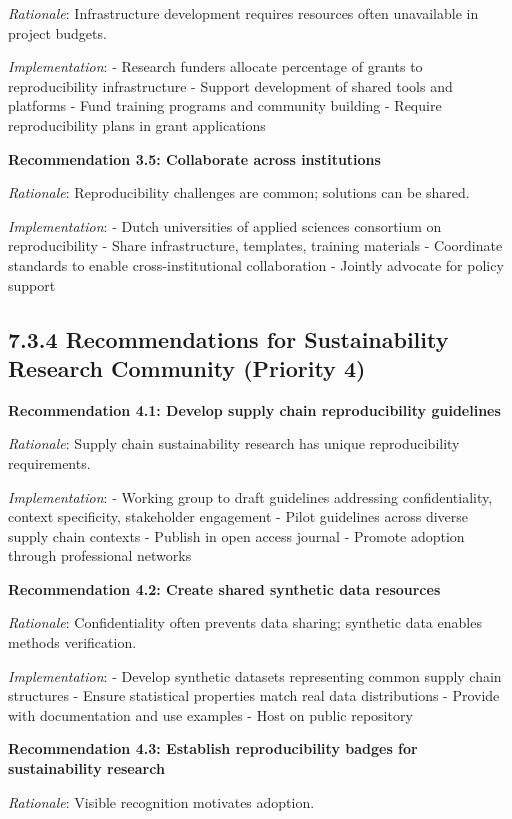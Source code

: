 \documentclass[
  oneside,
  open=any]{scrbook}
\begin{document}
\emph{Rationale}: Infrastructure development requires resources often
unavailable in project budgets.

\emph{Implementation}: - Research funders allocate percentage of grants
to reproducibility infrastructure - Support development of shared tools
and platforms - Fund training programs and community building - Require
reproducibility plans in grant applications

\textbf{Recommendation 3.5: Collaborate across institutions}

\emph{Rationale}: Reproducibility challenges are common; solutions can
be shared.

\emph{Implementation}: - Dutch universities of applied sciences
consortium on reproducibility - Share infrastructure, templates,
training materials - Coordinate standards to enable cross-institutional
collaboration - Jointly advocate for policy support

\subsection{7.3.4 Recommendations for Sustainability Research Community
(Priority
4)}\label{recommendations-for-sustainability-research-community-priority-4}

\textbf{Recommendation 4.1: Develop supply chain reproducibility
guidelines}

\emph{Rationale}: Supply chain sustainability research has unique
reproducibility requirements.

\emph{Implementation}: - Working group to draft guidelines addressing
confidentiality, context specificity, stakeholder engagement - Pilot
guidelines across diverse supply chain contexts - Publish in open access
journal - Promote adoption through professional networks

\textbf{Recommendation 4.2: Create shared synthetic data resources}

\emph{Rationale}: Confidentiality often prevents data sharing; synthetic
data enables methods verification.

\emph{Implementation}: - Develop synthetic datasets representing common
supply chain structures - Ensure statistical properties match real data
distributions - Provide with documentation and use examples - Host on
public repository

\textbf{Recommendation 4.3: Establish reproducibility badges for
sustainability research}

\emph{Rationale}: Visible recognition motivates adoption.
\end{document}
